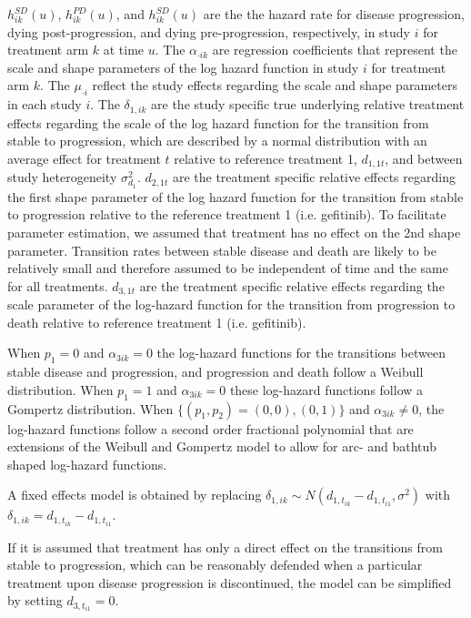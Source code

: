 \documentclass[11pt,final,fleqn]{article}\usepackage[]{graphicx}\usepackage[]{color}
\theoremstyle{plain}
\begin{document}
{$h_{ik}^{SD}(u)$, $h_{ik}^{PD}(u)$, and $h_{ik}^{SD}(u)$ are the the hazard rate for disease progression, dying post-progression, and dying pre-progression, respectively, in study $i$ for treatment arm $k$ at time $u$. The $\alpha_{\cdot ik}$ are regression coefficients that represent the scale and shape parameters of the log hazard function in study $i$ for treatment arm $k$. The $\mu_{\cdot i}$ reflect the study effects regarding the scale and shape parameters in each study $i$. The $\delta_{1,ik} $ are the study specific true underlying relative treatment effects regarding the scale of the log hazard function for the transition from stable to progression, which are described by a normal distribution with an average effect for treatment $t$ relative to reference treatment 1, ${d_{1,1t}}$, and between study heterogeneity $\sigma_{d_{1}}^{2} $.  ${d_{2,1t}}$ are the treatment specific relative effects regarding the first shape parameter of the log hazard function for the transition from stable to progression relative to the reference treatment 1 (i.e. gefitinib). To facilitate parameter estimation, we assumed that treatment has no effect on the 2nd shape parameter. Transition rates between stable disease and death are likely to be relatively small and therefore assumed to be independent of time and the same for all treatments. ${d_{3,1t}}$ are the treatment specific relative effects regarding the scale parameter of the log-hazard function for the transition from progression to death relative to reference treatment 1 (i.e. gefitinib). 

When $p_{1}=0$ and $\alpha_{3ik}=0$ the log-hazard functions for the transitions between stable disease and progression, and progression and death follow a Weibull distribution. When $p_{1}=1$ and $\alpha_{3ik}=0$ these log-hazard functions follow a Gompertz distribution. When $\{(p_1, p_2) = (0, 0), (0,1)\}$ and $\alpha_{3ik}\neq0$, the log-hazard functions follow a second order fractional polynomial that are extensions of the Weibull and Gompertz model to allow for arc- and bathtub shaped log-hazard functions. 

A fixed effects model is obtained by replacing $\delta_{1,ik} \sim N(d_{1, t_{ik}} - d_{1, t_{i1}}, \sigma^2)$ with $\delta_{1,ik} = d_{1, t_{ik}} - d_{1, t_{i1}}$. 

If it is assumed that treatment has only a direct effect on the transitions from stable to progression, which can be reasonably defended when a particular treatment upon disease progression is discontinued, the model can be simplified by setting $d_{3, t_{i1}}=0$.


}
\end{document}
